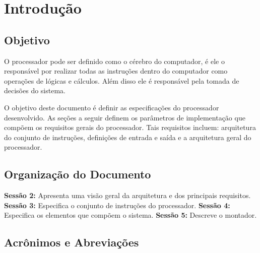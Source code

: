 \documentclass{report}
\begin{document}
\section{Introdução}
\subsection{Objetivo} 
O processador pode ser definido como o cérebro do computador, é ele o responsável por realizar todas as instruções dentro do computador como operações de lógicas e cálculos. Além disso ele é responsável pela tomada de decisões do sistema.

O objetivo deste documento é definir as especificações do processador desenvolvido. As seções a seguir definem os parâmetros de implementação que compõem os requisitos gerais do processador. Tais requisitos incluem: arquitetura do conjunto de instruções, definições de entrada e saída e a arquitetura geral do processador. 

\subsection{Organização do Documento} 
\textbf{Sessão 2:} Apresenta uma visão geral da arquitetura e dos principais requisitos. \newline
\textbf{Sessão 3:} Especifica o conjunto de instruções do processador. \newline
\textbf{Sessão 4:} Especifica os elementos que compõem o sistema.\newline
\textbf{Sessão 5:} Descreve o montador. \newline

\subsection{Acrônimos e Abreviações}
\end{document}
